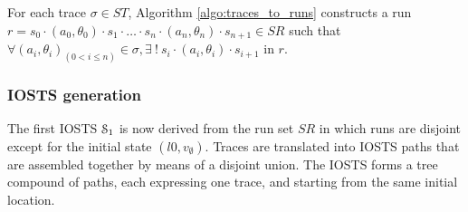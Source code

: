 \begin{proposition}
    For each trace $\sigma \in ST$, Algorithm \ref{algo:traces_to_runs}
    constructs a run $r=s_0 \cdot (a_0,\theta_0) \cdot s_1 \cdot
    \dots \cdot s_n \cdot (a_n,\theta_n) \cdot s_{n+1} \in SR$ such that
    $\forall (a_i,\theta_i)_{(0 < i\leq n)} \in \sigma, \exists ~!~ s_i
    \cdot (a_i,\theta_i) \cdot s_{i+1}$ in $r$.
\end{proposition}


\subsubsection{IOSTS generation}
\label{sec:iosts-gen}

The first IOSTS $\EuScript{S}_1$ is now derived from the run set
$SR$ in which runs are disjoint except for the initial state
$(l0,v_\emptyset)$. Traces are translated into IOSTS paths that
are assembled together by means of a disjoint union. The IOSTS
forms a tree compound of paths, each expressing one trace, and
starting from the same initial location.


